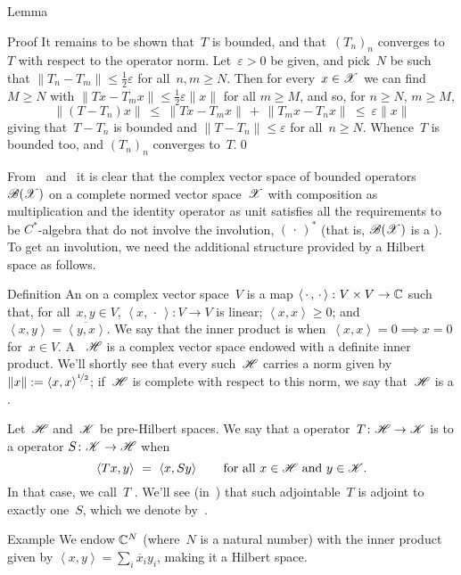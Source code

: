 \documentclass[a]{subfiles}
\begin{document}
\begin{parsec}[hilb]
\begin{point}{Lemma}
\begin{point}{Proof}
It remains to be shown that~$T$ is bounded,
and that~$(T_n)_n$ converges to~$T$ with respect to the operator norm.
Let~$\varepsilon>0$ be given, and pick~$N$ be such that
$\|T_n-T_m\|\leq \frac{1}{2}\varepsilon$ for all~$n,m\geq N$.
Then for every~$x\in \mathscr{X}$
we can find~$M\geq N$ with 
$\|T x - T_m x\|\leq \frac{1}{2}\varepsilon\|x\|$ for all $m\geq M$,
and so,
for $n\geq N$, $m\geq M$,
\begin{equation*}
\|(T - T_n) x\| \ \leq\ \|T x - T_mx\|\,+\,\|T_m x - T_n x\|
\ \leq\  \varepsilon\|x\|
\end{equation*}
giving that~$T-T_n$ is bounded
and $\|T-T_n\|\leq \varepsilon$ for all~$n\geq N$.
Whence~$T$ is bounded too,
and $(T_n)_n$ converges to~$T$.\qed
\end{point}
\end{point}
\begin{point}%
From~
and~
it is clear that the complex vector space
of bounded operators~$\mathscr{B}(\mathscr{X})$
on a complete normed vector space~$\mathscr{X}$
with composition as multiplication
and the identity operator as unit
satisfies all the requirements
to be $C^*$-algebra that do not involve the involution, $(\,\cdot\,)^*$
(that is, $\mathscr{B}(\mathscr{X})$ is a ).
To get an involution,
we need the additional structure
provided by a Hilbert space as follows.
\end{point}
\begin{point}{Definition}%
An 
on a complex vector space~$V$ 
is a map $\left<\,\cdot\,,\,\cdot\,\right>\colon V\times V\to \mathbb{C}$
such that,
for all~$x,y\in V$,
$\left<x,\,\cdot\,\right>\colon V\to V$ is linear;
$\left<x,x\right>\geq 0$;
and
$\left<x,y\right>=\overline{\left<y,x\right>}$.
We say that the inner product is 
when~$\left<x,x\right>=0\implies x=0$ for~$x\in V$.
A ~$\mathscr{H}$
is a complex vector space endowed with a definite inner product.
We'll shortly see that every such~$\mathscr{H}$
carries a norm
given by
 $\|x\|:= \left<x,x\right>^{\nicefrac{1}{2}}$;
if~$\mathscr{H}$ is complete with respect to this norm,
we say that~$\mathscr{H}$ is a .

Let~$\mathscr{H}$ and~$\mathscr{K}$ be pre-Hilbert spaces.
We say that a operator~$T\colon \mathscr{H}\to \mathscr{K}$
is 
to a operator
$S\colon \mathscr{K}\to \mathscr{H}$ 
when
\begin{equation*}
\left<Tx,y\right> \ = \ \left<x,Sy\right>
\qquad\text{for all $x\in \scrH$ and $y\in \scrK$.}
\end{equation*}
In that case, we call~$T$ .
We'll see (in~)
that such adjointable~$T$ is adjoint to exactly one~$S$,
which we denote by~.
\end{point}
\begin{point}{Example}%
We endow $\mathbb{C}^N$
(where~$N$ is a natural number)
with the inner product
given by
$\left<x,y\right>=\sum_i \overline{x}_iy_i$,
making it a Hilbert space.


\end{point}
\end{parsec}
\end{document}

